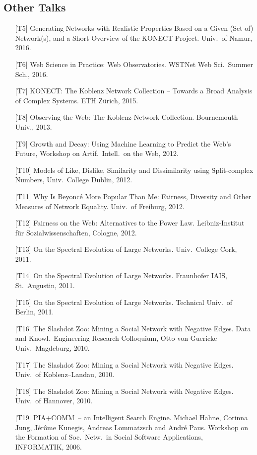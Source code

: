 \documentclass[line,margin]{res}
\newcounter{x}
\begin{document}
\begin{resume}
\section{Other Talks}
\begin{itemize}
  \item[{[T5]}] Generating Networks with Realistic Properties Based on a
    Given (Set of) Network(s), and a Short Overview of the KONECT
    Project.  Univ.\ of Namur, 2016. 
  \item[{[T6]}] Web Science in Practice:  Web Observatories.  WSTNet Web
    Sci.\ Summer Sch., 2016.  
  \item[{[T7]}] KONECT: The Koblenz Network Collection -- Towards a Broad
    Analysis of Complex Systems.  ETH Zürich, 2015.
  \item[{[T8]}] Observing the Web: The Koblenz Network Collection.
    Bournemouth Univ., 2013.
  \item[{[T9]}] Growth and Decay: Using Machine Learning to Predict the Web's
    Future, Workshop on Artif.\ Intell.\ on the Web, 2012. 
  \item[{[T10]}] Models of Like, Dislike, Similarity and Dissimilarity using
    Split-complex Numbers, Univ.\ College Dublin, 2012. 
  \item[{[T11]}] Why Is Beyoncé More Popular Than Me:  Fairness, Diversity and
    Other Measures of Network Equality. Univ.\ of Freiburg, 2012. 
  \item[{[T12]}] Fairness on the Web: Alternatives to the Power
    Law. 
    Leibniz-Institut für Sozialwissenschaften, Cologne, 2012.  
  \item[{[T13]}] On the Spectral Evolution of Large Networks.  Univ.\ College
    Cork, 2011.   
  \item[{[T14]}] On the Spectral Evolution of Large Networks.  Fraunhofer IAIS,
    St.\ Augustin, 2011.  
  \item[{[T15]}] On the Spectral Evolution of Large Networks. Technical
    Univ.\ of Berlin, 2011.  
  \item[{[T16]}] The Slashdot Zoo: Mining a Social Network with Negative
    Edges. Data and Knowl.\ Engineering Research Colloquium,
    Otto von Guericke Univ.\ Magdeburg, 2010.  
  \item[{[T17]}] The Slashdot Zoo: Mining a Social Network with Negative
    Edges. Univ.\ of Koblenz--Landau, 2010. 
  \item[{[T18]}] The Slashdot Zoo: Mining a Social Network with Negative
    Edges. Univ.\ of Hannover, 2010. 
  \item[{[T19]}] PIA+COMM~-- an Intelligent Search Engine.
    Michael Hahne, Corinna Jung, Jérôme Kunegis, Andreas Lommatzsch and
    André Paus. 
    Workshop on the Formation of Soc.\ Netw.\ in Social Software
    Applications, INFORMATIK, 2006. 
\end{itemize}


\end{resume}
\end{document}
